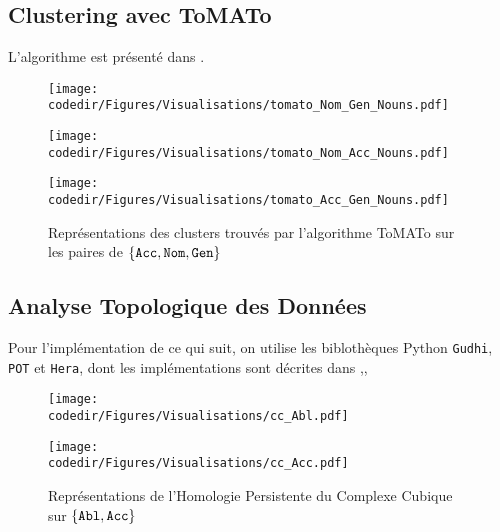 \documentclass{cours}
\newcommand{\codedir}{Morphosyntactic-Categories_Code}
\begin{document}
\subsection{Clustering avec ToMATo}
L'algorithme est présenté dans \cite{ToMATo}.
\begin{figure}[H]
    \begin{center}
        \begin{minipage}{.5\textwidth}
            \begin{center}
                \texttt{[image: \\codedir/Figures/Visualisations/tomato\_Nom\_Gen\_Nouns.pdf]}
            \end{center}
        \end{minipage}
    \end{center}

    \begin{minipage}{.5\textwidth}
        \begin{center}
            \texttt{[image: \\codedir/Figures/Visualisations/tomato\_Nom\_Acc\_Nouns.pdf]}
        \end{center}
    \end{minipage}
    \begin{minipage}{.5\textwidth}
        \begin{center}
            \texttt{[image: \\codedir/Figures/Visualisations/tomato\_Acc\_Gen\_Nouns.pdf]}
        \end{center}
    \end{minipage}
    \caption{Représentations des clusters trouvés par l'algorithme ToMATo sur les paires de $\{\tt Acc,Nom,Gen\}$}
\end{figure}

\subsection{Analyse Topologique des Données}
Pour l'implémentation de ce qui suit, on utilise les biblothèques Python \texttt{Gudhi}, \texttt{POT} et \texttt{Hera}, dont les implémentations sont décrites dans \cite{Gudhi},\cite{PythonPOT}, \cite{Hera}
\begin{figure}[H]
    \begin{minipage}{.5\textwidth}
        \begin{center}
            \texttt{[image: \\codedir/Figures/Visualisations/cc\_Abl.pdf]}
        \end{center}
    \end{minipage}
    \begin{minipage}{.5\textwidth}
        \begin{center}
            \texttt{[image: \\codedir/Figures/Visualisations/cc\_Acc.pdf]}
        \end{center}
    \end{minipage}
    \caption{Représentations de l'Homologie Persistente du Complexe Cubique sur $\{\tt Abl,Acc\}$}
\end{figure}
\end{document}
